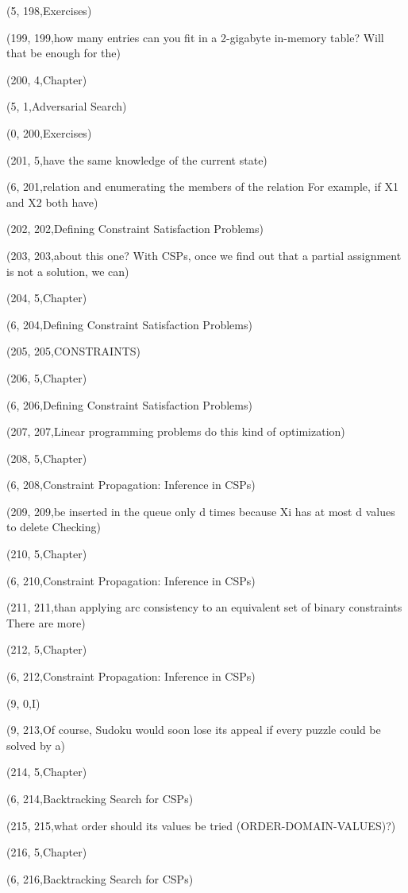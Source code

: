 (5, 198,Exercises)

(199, 199,how many entries can you ﬁt in a 2-gigabyte in-memory table? Will that be enough for the)

(200, 4,Chapter)

(5, 1,Adversarial Search)

(0, 200,Exercises)

(201, 5,have the same knowledge of the current state)

(6, 201,relation and enumerating the members of the relation For example, if X1 and X2 both have)

(202, 202,Deﬁning Constraint Satisfaction Problems)

(203, 203,about this one? With CSPs, once we ﬁnd out that a partial assignment is not a solution, we can)

(204, 5,Chapter)

(6, 204,Deﬁning Constraint Satisfaction Problems)

(205, 205,CONSTRAINTS)

(206, 5,Chapter)

(6, 206,Deﬁning Constraint Satisfaction Problems)

(207, 207,Linear programming problems do this kind of optimization)

(208, 5,Chapter)

(6, 208,Constraint Propagation: Inference in CSPs)

(209, 209,be inserted in the queue only d times because Xi has at most d values to delete Checking)

(210, 5,Chapter)

(6, 210,Constraint Propagation: Inference in CSPs)

(211, 211,than applying arc consistency to an equivalent set of binary constraints There are more)

(212, 5,Chapter)

(6, 212,Constraint Propagation: Inference in CSPs)

(9, 0,I)

(9, 213,Of course, Sudoku would soon lose its appeal if every puzzle could be solved by a)

(214, 5,Chapter)

(6, 214,Backtracking Search for CSPs)

(215, 215,what order should its values be tried (ORDER-DOMAIN-VALUES)?)

(216, 5,Chapter)

(6, 216,Backtracking Search for CSPs)

